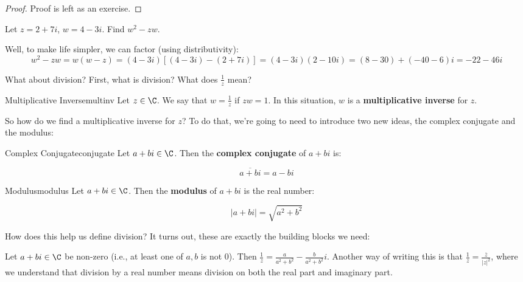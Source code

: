 \begin{proof} Proof is left as an exercise.\end{proof}

\begin{ex}{}{} Let $z = 2 + 7i$, $w = 4 - 3i$. Find $w^2 - zw$.

Well, to make life simpler, we can factor (using distributivity):
$$w^2 - zw = w(w-z) = (4-3i)[(4-3i) - (2 + 7i)] = (4-3i)(2 - 10i) = (8 - 30) + (-40 - 6)i = -22 - 46i$$

\end{ex}

What about division? First, what is division? What does $\frac{1}{z}$ mean? 

\begin{defbo}{Multiplicative Inverse}{multinv}
Let $z\in \C$. We say that $w = \frac{1}{z}$ if $zw =1$. In this situation, $w$ is a {\bf multiplicative inverse} for $z$.
\end{defbo}

So how do we find a multiplicative inverse for $z$? To do that, we're going to need to introduce two new ideas, the complex conjugate and the modulus:

\begin{defbo}{Complex Conjugate}{conjugate} 
Let $a+bi \in \C$. Then the {\bf complex conjugate} of $a+bi$ is:

$$\overline{a+bi} = a-bi$$
\end{defbo}

\begin{defbo}{Modulus}{modulus} 
Let $a+bi \in \C$. Then the {\bf modulus} of $a+bi$ is the real number:

$$|a+bi| = \sqrt{a^2 + b^2}$$
\end{defbo}

How does this help us define division? It turns out, these are exactly the building blocks we need:

\begin{lem}Let $a+bi\in \C$ be non-zero (i.e., at least one of $a,b$ is not 0). Then $\frac{1}{z} = \frac{a}{a^2 + b^2} - \frac{b}{a^2 + b^2}i$. Another way of writing this is that $\frac{1}{z} = \frac{\overline{z}}{\left|z\right|^2}$, where we understand that division by a real number means division on both the real part and imaginary part.\end{lem}

